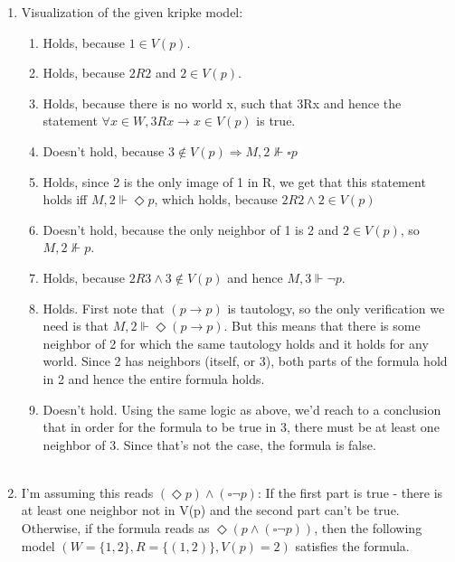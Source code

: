 \documentclass{article}
\newcommand{\then}{\longrightarrow}
\begin{document}
\begin{enumerate}
	\item Visualization of the given kripke model: \begin{minipage}[t]{0.45\linewidth}
                          \raggedright
                          \medskip
                      \end{minipage}
	\begin{enumerate}
		\item Holds, because $1 \in V(p)$.
		\item Holds, because $2R2$ and $2 \in V(p)$.
		\item Holds, because there is no world x, such that 3Rx and hence the statement $\forall x \in W, 3Rx \then x \in V(p)$ is true.
		\item Doesn't hold, because $3 \notin V(p) \Rightarrow M,2\nVdash\square p$
		\item Holds, since 2 is the only image of 1 in R, we get that this statement holds iff $M,2\Vdash\Diamond p$, which holds, because $2R2 \land 2 \in V(p)$
		\item Doesn't hold, because the only neighbor of 1 is 2 and $2 \in V(p)$, so $M,2\nVdash p$.
		\item Holds, because $2R3 \land 3 \notin V(p)$ and hence $M,3\Vdash \lnot p$.
		\item Holds. First note that $(p\then p)$ is tautology, so the only verification we need is that $M,2\Vdash\Diamond(p\then p)$. But this means that there is some neighbor of 2 for which the same tautology holds and it holds for any world. Since 2 has neighbors (itself, or 3), both parts of the formula hold in 2 and hence the entire formula holds.
		\item Doesn't hold. Using the same logic as above, we'd reach to a conclusion that in order for the formula to be true in 3, there must be at least one neighbor of 3. Since that's not the case, the formula is false.\\\\
	\end{enumerate}
        \newpage


	\item I'm assuming this reads $(\Diamond p) \land (\square \lnot p)$: If the first part is true - there is at least one neighbor not in V(p) and the second part can't be true.\\
	Otherwise, if the formula reads as $\Diamond (p \land (\square \lnot p))$, then the following model $(W=\{1,2\}, R=\{(1,2)\}, V(p)={2})$ satisfies the formula.\\\\



\end{enumerate}
\end{document}
